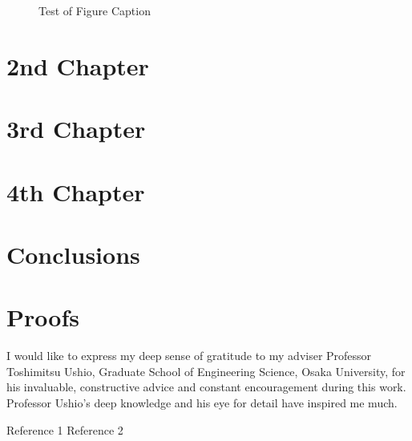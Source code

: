 \documentclass[a4j,12pt,oneside,openany,english]{jsbook}
\begin{document}
\begin{figure}
	\caption{Test of Figure Caption}
\end{figure}


\chapter{2nd Chapter}

\chapter{3rd Chapter}

\chapter{4th Chapter}

\chapter{Conclusions}

\appendix
\chapter{Proofs}

\begin{acknowledgement}
	I would like to express my deep sense of gratitude to my adviser Professor
	Toshimitsu Ushio, Graduate School of Engineering Science, Osaka University,
	for his invaluable, constructive advice and constant encouragement during this work.
	Professor Ushio's deep knowledge and his eye for detail have inspired me much.
\end{acknowledgement}

\begin{thebibliography}{99}
 Reference 1
 Reference 2
\end{thebibliography}
%
%
\end{document}
